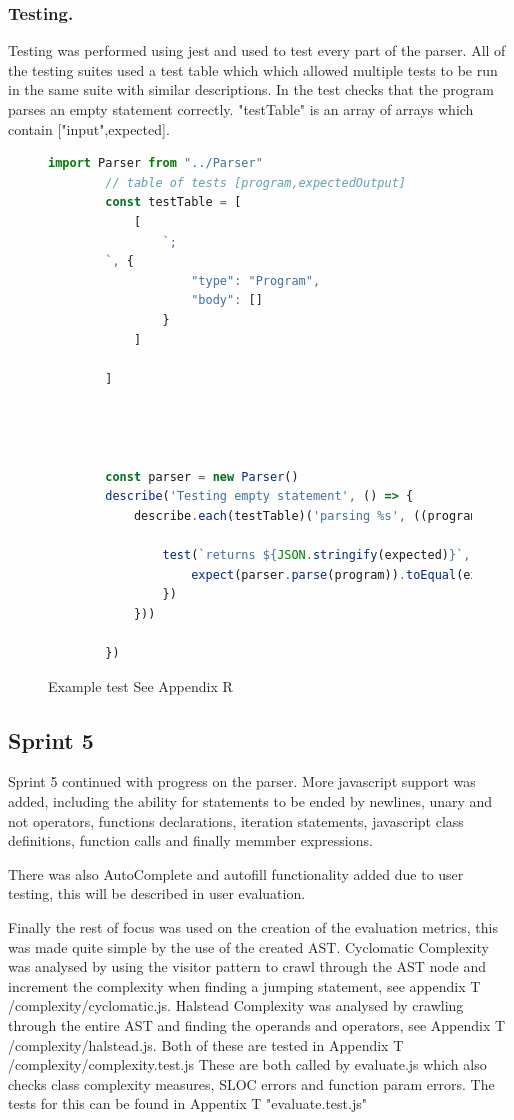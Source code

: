 \subsubsection{Testing.} Testing was performed using jest \cite{jest} and used to test every part of the parser. All of the testing suites used a test table which 
which allowed multiple tests to be run in the same suite with similar descriptions. In  the test checks that the program parses 
an empty statement correctly. "testTable" is an array of arrays which contain ["input",{expected}].
\begin{figure}[h]    
\begin{lstlisting}[language=Javascript]
        import Parser from "../Parser"
        // table of tests [program,expectedOutput]
        const testTable = [
            [
                `;
        `, {
                    "type": "Program",
                    "body": []
                }
            ]
        
        ]
        
        
        
        
        const parser = new Parser()
        describe('Testing empty statement', () => {
            describe.each(testTable)('parsing %s', ((program, expected) => {
        
                test(`returns ${JSON.stringify(expected)}`, () => {
                    expect(parser.parse(program)).toEqual(expected)
                })
            }))
        
        })
    \end{lstlisting}
    \caption{Example test  See Appendix R}
    \label{fig:test}
\end{figure}
\subsection{Sprint 5}
Sprint 5 continued with progress on the parser. More javascript support was added, including the ability for statements to be ended by 
newlines, unary and not operators, functions declarations, iteration statements, javascript class definitions, function calls and finally memmber expressions.

There was also AutoComplete and autofill functionality added due to user testing, this will be described in user evaluation.

Finally the rest of focus was used on the creation of the evaluation metrics, this was made quite simple by the use of the created AST.
Cyclomatic Complexity was analysed by using the visitor pattern to crawl through the AST node and increment the complexity when finding a jumping statement, see appendix T /complexity/cyclomatic.js.
Halstead Complexity was analysed by crawling through the entire AST and finding the operands and operators, see Appendix T /complexity/halstead.js. Both of these are tested in Appendix T /complexity/complexity.test.js
\newline
These are both called by evaluate.js which also checks class complexity measures, SLOC errors and function param errors. The tests for this can be found in Appentix T "evaluate.test.js"
\newpage

